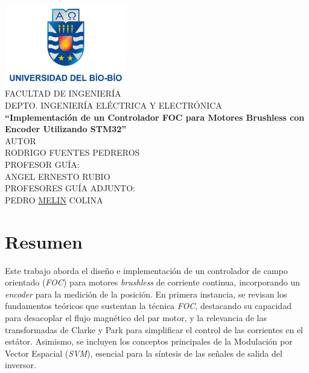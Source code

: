 \documentclass[11pt]{report}
\begin{document}
\begin{titlepage}
	\begin{center}
		\includegraphics[width=0.4\textwidth]{imagenes/logo_ubb.png}\\
		\normalsize FACULTAD DE INGENIERÍA\\
		DEPTO. INGENIERÍA ELÉCTRICA Y ELECTRÓNICA\\[2cm]

		\LARGE \textbf{``Implementación de un Controlador FOC para Motores Brushless con Encoder Utilizando STM32''}\\[5cm]

		\normalsize AUTOR\\
		RODRIGO FUENTES PEDREROS\\[3cm]

		\large PROFESOR GUÍA:\\
		\large ANGEL ERNESTO RUBIO\\[1cm]
		\large PROFESORES GUÍA ADJUNTO:\\
		\large PEDRO \href{https://youtu.be/UJwA7hu3aug?si=OvcJZs2QosQupum7&t=50}{MELIN} COLINA
	\end{center}
\end{titlepage}

\normalsize
{}
\setcounter{page}{3}

\newpage
\tableofcontents

\newpage
\listoffigures

\listoftables

\newpage
\chapter*{Resumen}

Este trabajo aborda el diseño e implementación de un controlador de campo orientado (\emph{FOC}) para motores \emph{brushless} de corriente continua, incorporando un \emph{encoder} para la medición de la posición. En primera instancia, se revisan los fundamentos teóricos que sustentan la técnica \emph{FOC}, destacando su capacidad para desacoplar el flujo magnético del par motor, y la relevancia de las transformadas de Clarke y Park para simplificar el control de las corrientes en el estátor. Asimismo, se incluyen los conceptos principales de la Modulación por Vector Espacial (\emph{SVM}), esencial para la síntesis de las señales de salida del inversor.
\end{document}
